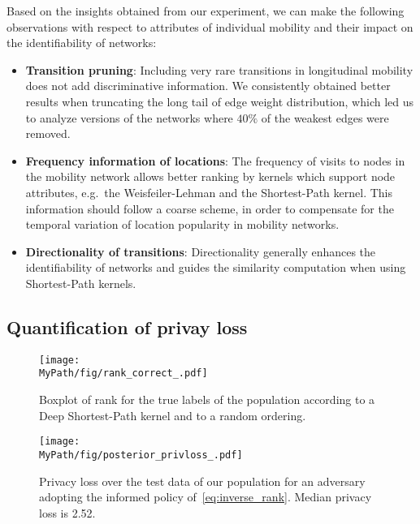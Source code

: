 Based on the insights obtained from our experiment, we can make the following observations with respect to attributes of individual mobility and their impact on the identifiability of networks:
%




\begin{itemize}

	\item \textbf{Transition pruning}: Including very rare transitions in longitudinal mobility does not add discriminative information.
	We consistently obtained better results when truncating the long tail of edge weight distribution, which led us to analyze versions of the networks where $40\%$ of the weakest edges were removed.
	\item \textbf{Frequency information of locations}: The frequency of visits to nodes in the mobility network allows better ranking by kernels which support node attributes, e.g.\ the Weisfeiler-Lehman and the Shortest-Path kernel.
	This information should follow a coarse scheme, in order to compensate for the temporal variation of location popularity in mobility networks.
	\item \textbf{Directionality of transitions}: Directionality generally enhances the identifiability of networks and guides the similarity computation when using Shortest-Path kernels.
\end{itemize}

\subsection{Quantification of privay loss}

\begin{figure}[!t]
	\centering
	\begin{minipage}[b]{.45\textwidth}
		\texttt{[image: \\MyPath/fig/rank\_correct\_.pdf]}
		\caption{{Boxplot of rank for the true labels of the population according to a Deep Shortest-Path kernel and to a random ordering.}}
		\label{fig:rank_correct}
	\end{minipage}\qquad
	\begin{minipage}[b]{.45\textwidth}
		\texttt{[image: \\MyPath/fig/posterior\_privloss\_.pdf]}
		\centering \caption{{Privacy loss over the test data of our population for an adversary adopting the informed policy of~\eqref{eq:inverse_rank}. Median privacy loss is 2.52.}}
		\label{fig:privloss}
	\end{minipage}
\end{figure}

